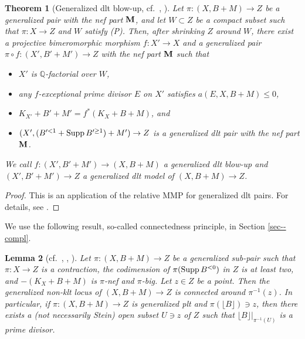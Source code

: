 \documentclass[12pt]{amsart}
\newtheorem{thm}{Theorem}[section]
\newtheorem{lem}[thm]{Lemma}
\theoremstyle{definition}
\begin{document}
\begin{thm}[Generalized dlt blow-up, {cf.~\cite[2.13 (3)]{birkar-compl}, \cite[Theorem 2.6]{hacon-xie-acc-lct}}]\label{thm--gen-dlt-model}
Let $\pi \colon (X,B+M) \to Z$ be a generalized pair with the nef part $\boldsymbol{\rm M}$, and let $W \subset Z$ be a compact subset such that $\pi \colon X \to Z$ and $W$ satisfy {\rm (P)}. 
Then, after shrinking $Z$ around $W$, there exist a projective bimeromorphic morphism $f \colon X' \to X$ and a generalized pair $\pi \circ f \colon (X',B'+M') \to Z$  with the nef part $\boldsymbol{\rm M}$ such that
\begin{itemize}
\item
$X'$ is $\mathbb{Q}$-factorial over $W$, 
\item
any $f$-exceptional prime divisor $E$ on $X'$ satisfies $a(E,X,B+M) \leq 0$, 
\item
$K_{X'}+B'+M'=f^{*}(K_{X}+B+M)$, and
\item
$(X', (B'^{<1}+{\rm Supp}\,B'^{\geq 1})+M') \to Z$ is a generalized dlt pair with the nef part $\boldsymbol{\rm M}$. 
\end{itemize}
We call $f \colon (X',B'+M') \to (X,B+M)$ a {\rm generalized dlt blow-up} and $(X',B'+M') \to Z$ a {\em generalized dlt model} of $(X,B+M) \to Z$. 
\end{thm}

\begin{proof}
This is an application of the relative MMP for generalized dlt pairs. 
For details, see \cite[Proof of Theorem 2.6]{hacon-xie-acc-lct}. 
\end{proof}



We use the following result, so-called connectedness principle, in Section \ref{sec--compl}. 

\begin{lem}[cf.~{\cite[Lemma 2.14]{birkar-compl}, \cite[Proposition 3.1]{filipazzi-svaldi}, \cite[Lemma 3.3]{birkar-connect}}]\label{lem--conn-princi}
Let $\pi \colon (X,B+M) \to Z$ be a generalized sub-pair such that $\pi \colon X \to Z$ is a contraction, the codimension of $\pi({\rm Supp}\,B^{<0})$ in $Z$ is at least two, and $-(K_{X}+B+M)$ is $\pi$-nef and $\pi$-big. 
Let $z \in Z$ be a point. 
Then the generalized non-klt locus of $(X,B+M) \to Z$ is connected around $\pi^{-1}(z)$. 
In particular, if $\pi \colon (X,B+M) \to Z$ is generalized plt and $\pi(\lfloor B\rfloor) \ni z$, then there exists a (not necessarily Stein) open subset $U \ni z$ of $Z$ such that $\lfloor B\rfloor|_{\pi^{-1}(U)}$ is a prime divisor. 
\end{lem}
\end{document}
